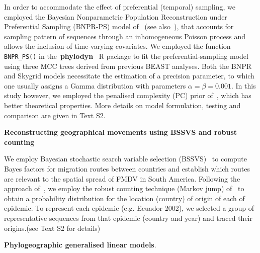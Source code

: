 \documentclass[10pt]{article}
\begin{document}
In order to accommodate the effect of preferential (temporal) sampling, we employed the Bayesian Nonparametric Population Reconstruction under Preferential Sampling (BNPR-PS) model of~\cite{Karcher2020} (see also~\cite{Karcher2016}), that accounts for sampling pattern of sequences through an inhomogeneous Poisson process and allows the inclusion of time-varying covariates.
We employed the function \verb|BNPR_PS()| in the~\textbf{phylodyn}~\citep{Karcher2017} R package to fit the preferential-sampling model using three MCC trees derived from previous BEAST analyses. %
Both the BNPR and Skygrid models necessitate the estimation of a precision parameter, to which one usually assigns a Gamma distribution with parameters $\alpha = \beta = 0.001$.
In this study however, we employed the penalised complexity (PC) prior of~\cite{Simpson2017}, which has better theoretical properties. %
More details on model formulation, testing and comparison are given in Text S2. %

\textbf{Reconstructing geographical movements using BSSVS and robust counting}

We employ Bayesian stochastic search variable selection (BSSVS)~\citep{Lemey2009} to compute Bayes factors for migration routes between countries and establish which routes are relevant to the spatial spread of FMDV in South America.
Following the approach of~\citet{Hall2013}, we employ the robust counting technique (Markov jump) of~\cite{Minin2008b} to obtain a probability distribution for the location (country) of origin of each of epidemic.
To represent each epidemic (e.g. Ecuador 2002), we selected a group of representative sequences from that epidemic (country and year) and traced their origins.(see Text S2 for details)

\textbf{Phylogeographic generalised linear models}.
\end{document}
